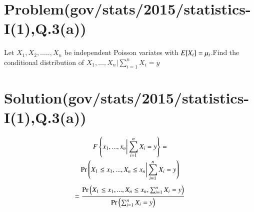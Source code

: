 \documentclass[journal,12pt,twocolumn]{IEEEtran}
\begin{document}
\section{Problem(gov/stats/2015/statistics-I(1),Q.3(a))}
Let $X_1,X_2,.....,X_n$ be independent Poisson variates with $E[ X_i ]=\mu_i$.Find the conditional distribution of $X_1,...,X_n\biggr\vert\sum_{i=1}^{n}X_i=y$
\section{Solution(gov/stats/2015/statistics-I(1),Q.3(a))}
\begin{multline}
    F\left\{x_1,...,x_n\biggr\vert\sum_{i=1}^{n}X_i=y\right\}=\\
    \Pr\left(X_1\leq x_1,...,X_n\leq x_n\biggr\vert\sum_{i=1}^{n}X_i=y\right)
\end{multline}
\begin{align}
    =\frac{\Pr\left(X_1\leq x_1,...,X_n\leq x_n,\sum_{i=1}^{n}X_i=y\right)}{\Pr\left(\sum_{i=1}^{n}X_i=y\right)}
    \label{num}
\end{align}
\end{document}
